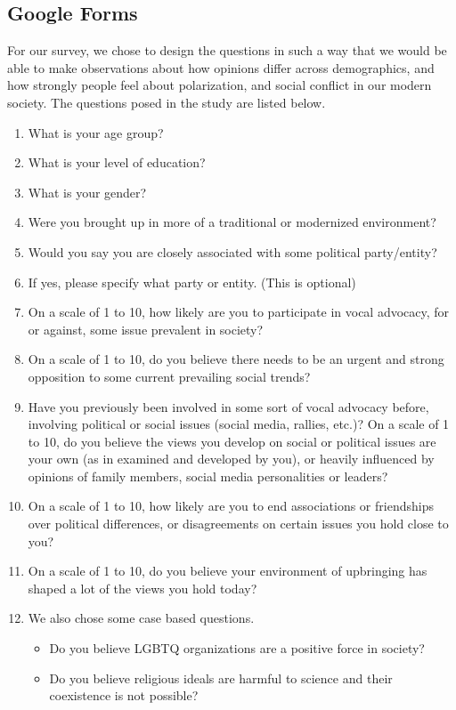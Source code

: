 \documentclass{article}
\begin{document}
\subsection{Google Forms}
For our survey, we chose to design the questions in such a way that we would be able to make observations about how opinions differ across demographics, and how strongly people feel about polarization, and social conflict in our modern society.
The questions posed in the study are listed below.
\begin{enumerate}
    \item What is your age group?
    \item What is your level of education?
    \item What is your gender?
    \item Were you brought up in more of a traditional or modernized environment?
    \item Would you say you are closely associated with some political party/entity?
    \item If yes, please specify what party or entity. (This is optional)
    \item On a scale of 1 to 10, how likely are you to participate in vocal advocacy, for or against, some issue prevalent in society? 
    \item On a scale of 1 to 10, do you believe there needs to be an urgent and strong opposition to some current prevailing social trends?
    \item Have you previously been involved in some sort of vocal advocacy before, involving political or social issues (social media, rallies, etc.)?
    On a scale of 1 to 10, do you believe the views you develop on social or political issues are your own (as in examined and developed by you), or heavily influenced by opinions of family members, social media personalities or leaders?
    \item On a scale of 1 to 10, how likely are you to end associations or friendships over political differences, or disagreements on certain issues you hold close to you?
    \item On a scale of 1 to 10, do you believe your environment of upbringing has shaped a lot of the views you hold today?
    \item We also chose some case based questions.
    \begin{itemize}
        \item  Do you believe LGBTQ organizations are a positive force in society?
        \item Do you believe religious ideals are harmful to science and their coexistence is not possible?
    \end{itemize}

\end{enumerate}
\end{document}
